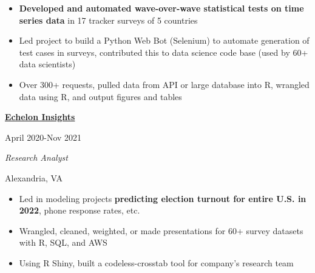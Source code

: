 \documentclass[
  16,
]{article}
\providecommand{\tightlist}{%
  \setlength{\itemsep}{0pt}\setlength{\parskip}{0pt}}\usepackage{longtable,booktabs,array}
\begin{document}
\begin{itemize}
\tightlist
\item
  \textbf{Developed and automated wave-over-wave statistical tests on
  time series data} in 17 tracker surveys of 5 countries
\item
  Led project to build a Python Web Bot (Selenium) to automate
  generation of test cases in surveys, contributed this to data science
  code base (used by 60+ data scientists)
\item
  Over 300+ requests, pulled data from API or large database into R,
  wrangled data using R, and output figures and tables
\end{itemize}

\vspace{7pt}

\begin{large}
  \begin{multicols}{2}
    \begin{flushleft}{\bf \href{https://echeloninsights.com/}{Echelon Insights}}\end{flushleft}
    \begin{flushright}April 2020-Nov 2021\end{flushright}
  \end{multicols}
  \vspace{-0.17cm}
  \begin{multicols}{2}
    \begin{flushleft}\textit{Research Analyst}\end{flushleft}
    \begin{flushright}Alexandria, VA\end{flushright}
  \end{multicols}
\end{large}
\vspace{-0.16cm}

\begin{itemize}
\tightlist
\item
  Led in modeling projects \textbf{predicting election turnout for
  entire U.S. in 2022}, phone response rates, etc.
\item
  Wrangled, cleaned, weighted, or made presentations for 60+ survey
  datasets with R, SQL, and AWS
\item
  Using R Shiny, built a codeless-crosstab tool for company's research
  team
\end{itemize}

\vspace{7pt}
\end{document}
